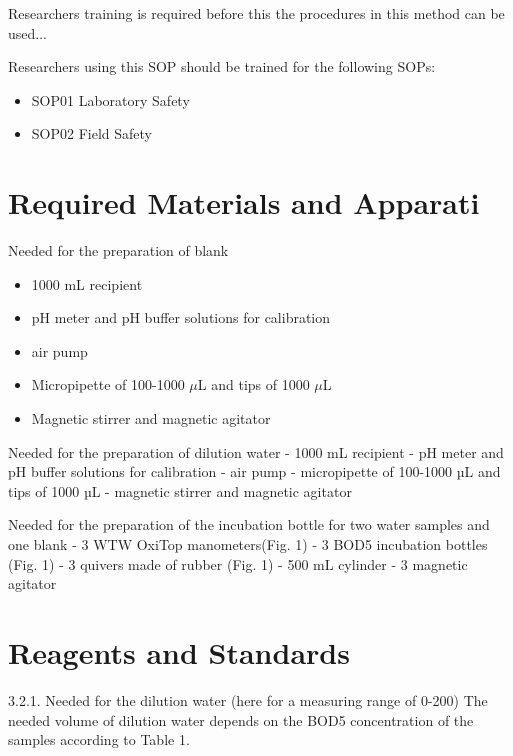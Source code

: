 \documentclass[12pt]{../SOP3_beta}\usepackage[]{graphicx}\usepackage[]{xcolor}
\begin{document}
\NP Researchers training is required before this the procedures in this method can be used... 

\NP Researchers using this SOP should be trained for the following SOPs:

\begin{itemize}
  \item SOP01 Laboratory Safety
  \item SOP02 Field Safety
\end{itemize}

\section{Required Materials and Apparati}

\NP Needed for the preparation of blank

\begin{itemize}
  \item 1000 mL recipient
  \item pH meter and pH buffer solutions for calibration
  \item air pump
  \item Micropipette of 100-1000 $\mu$L and tips of 1000 $\mu$L  
  \item Magnetic stirrer and magnetic agitator
\end{itemize}

\NP Needed for the preparation of dilution water
- 1000 mL recipient
- pH meter and pH buffer solutions for calibration
- air pump
- micropipette of 100-1000 µL and tips of 1000 µL
- magnetic stirrer and magnetic agitator

\NP Needed for the preparation of the incubation bottle for two water samples and one blank
- 3 WTW OxiTop manometers(Fig. 1)
- 3 BOD5 incubation bottles (Fig. 1)
- 3 quivers made of rubber (Fig. 1)
- 500 mL cylinder
- 3 magnetic agitator



\section{Reagents and Standards}

3.2.1. Needed for the dilution water (here for a measuring range of 0-200)
The needed volume of dilution water depends on the BOD5 concentration of the samples according
to Table 1.
\end{document}
